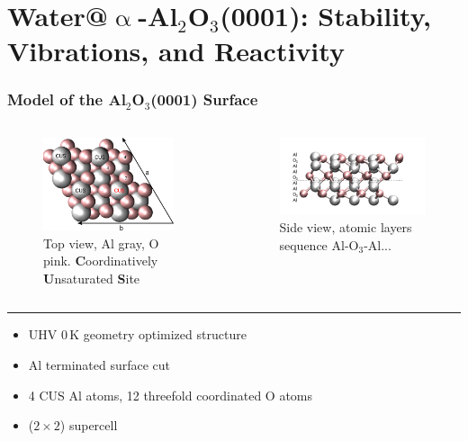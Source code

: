 \documentclass[hyperref={pdfpagelabels=false}]{beamer}
\begin{document}
\section{Water@$\upalpha$-Al$_2$O$_3$(0001): Stability, Vibrations, and Reactivity}
\begin{frame}
 \frametitle{Model of the Al$_2$O$_3$(0001) Surface}
 \begin{columns}
   \begin{figure}
  \includegraphics[width=0.9\textwidth]{figures/surf_0K_axes.pdf}
  \caption{Top view, Al gray, O pink. \textbf{C}oordinatively \textbf{U}nsaturated \textbf{S}ite}
  \end{figure}
  \begin{figure}
  \includegraphics[width=1.\textwidth]{figures/surf_0K-side.pdf}
  \caption{Side view, atomic layers sequence Al-O$_3$-Al...}
  \end{figure}
  \end{columns}
 \hrule
 \begin{itemize}
  \item UHV $0\,$K geometry optimized structure
  \item Al terminated surface cut
  \item 4 CUS Al atoms, 12 threefold coordinated O atoms
  \item ($2\times 2$) supercell
 \end{itemize}
\end{frame}
\end{document}

